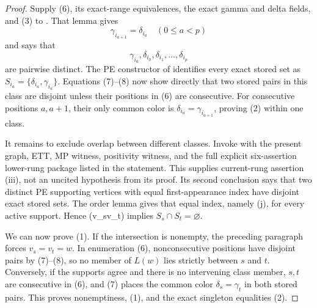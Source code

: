 \begin{proof}
Supply (6), its exact-range equivalences, the exact gamma and delta fields,
and (3) to .  That lemma gives
\[
 \gamma_{i_{a+1}}=\delta_{i_a}\quad(0\leq a<p)                 \tag{7}
\]
and says that
\[
 \gamma_{i_0},\delta_{i_0},\delta_{i_1},\ldots,\delta_{i_p}    \tag{8}
\]
are pairwise distinct.  The PE constructor of
 identifies every exact stored set as
\(S_{i_a}=\{\delta_{i_a},\gamma_{i_a}\}\).  Equations (7)--(8) now show
directly that two stored pairs in this class are disjoint unless their
positions in (6) are consecutive.  For consecutive positions \(a,a+1\),
their only common color is
\(\delta_{i_a}=\gamma_{i_{a+1}}\), proving (2) within one class.

It remains to exclude overlap between different classes.  Invoke
 with the present graph, ETT, MP witness,
positivity witness, and the full explicit six-assertion lower-rung package
listed in the statement.  This supplies current-rung assertion (iii), not
an uncited hypothesis from its proof.  Its second conclusion says that
two distinct PE supporting vertices with equal first-appearance index
have disjoint exact stored sets.  The order lemma gives that equal index,
namely (j), for every active support.  Hence (v_s\ne v_t) implies
\(S_s\cap S_t=\varnothing\).

We can now prove (1).  If the intersection is nonempty, the preceding
paragraph forces \(v_s=v_t=w\).  In enumeration (6), nonconsecutive
positions have disjoint pairs by (7)--(8), so no member of \(L(w)\) lies
strictly between \(s\) and \(t\).  Conversely, if the supports agree and
there is no intervening class member, \(s,t\) are consecutive in (6),
and (7) places the common color \(\delta_s=\gamma_t\) in both stored
pairs.  This proves nonemptiness, (1), and the exact singleton equalities
(2).
\end{proof}
